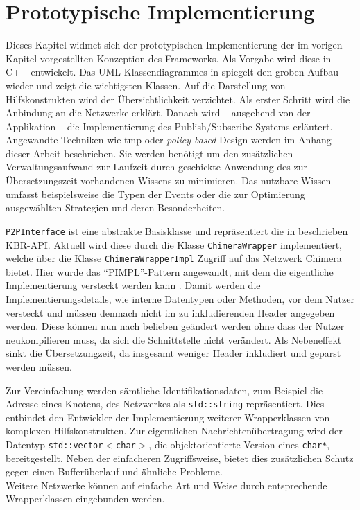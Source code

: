 \chapter{Prototypische Implementierung}
\label{chap:impl}
Dieses Kapitel widmet sich der prototypischen Implementierung der im vorigen Kapitel vorgestellten Konzeption des Frameworks. Als Vorgabe wird diese in  C++ entwickelt. Das UML-Klassendiagrammes in  spiegelt den groben Aufbau wieder und zeigt die wichtigsten Klassen. Auf die Darstellung von Hilfskonstrukten wird der Übersichtlichkeit verzichtet. Als erster Schritt wird die Anbindung an die Netzwerke erklärt. Danach wird -- ausgehend von der Applikation -- die Implementierung des Publish/Subscribe-Systems erläutert. Angewandte Techniken wie \ac{tmp} oder \emph{policy based}-Design werden im Anhang dieser Arbeit beschrieben. Sie werden benötigt um den zusätzlichen Verwaltungsaufwand zur Laufzeit durch geschickte Anwendung des zur Übersetzungszeit vorhandenen Wissens zu minimieren. Das nutzbare Wissen umfasst beispielsweise die Typen der Events oder die zur Optimierung ausgewählten Strategien und deren Besonderheiten.

\texttt{P2PInterface} ist eine abstrakte Basisklasse und repräsentiert die in \cite{Dabek2003Towards} beschrieben KBR-API. Aktuell wird diese durch die Klasse \texttt{ChimeraWrapper} implementiert, welche über die Klasse \texttt{ChimeraWrapperImpl} Zugriff auf das Netzwerk Chimera bietet. Hier wurde das \enquote{PIMPL}-Pattern angewandt, mit dem die eigentliche Implementierung versteckt werden kann \cite{Alexandrescu2001Modern}. Damit werden die Implementierungsdetails, wie interne Datentypen oder Methoden, vor dem Nutzer versteckt und müssen demnach nicht im zu inkludierenden Header angegeben werden. Diese können nun nach belieben geändert werden ohne dass der Nutzer neukompilieren muss, da sich die Schnittstelle nicht verändert. Als Nebeneffekt sinkt die Übersetzungzeit, da insgesamt weniger Header inkludiert und geparst werden müssen.

Zur Vereinfachung werden sämtliche Identifikationsdaten, zum Beispiel die Adresse eines Knotens, des Netzwerkes als \texttt{std::string} repräsentiert. Dies entbindet den Entwickler der Implementierung weiterer Wrapperklassen von komplexen Hilfskonstrukten. Zur eigentlichen Nachrichtenübertragung wird der Datentyp \texttt{std::vector$<$char$>$}, die objektorientierte Version eines \texttt{char*}, bereitgestellt. Neben der einfacheren Zugriffsweise, bietet dies zusätzlichen Schutz gegen einen Bufferüberlauf und ähnliche Probleme.\\
Weitere Netzwerke können auf einfache Art und Weise durch entsprechende Wrapperklassen eingebunden werden.

